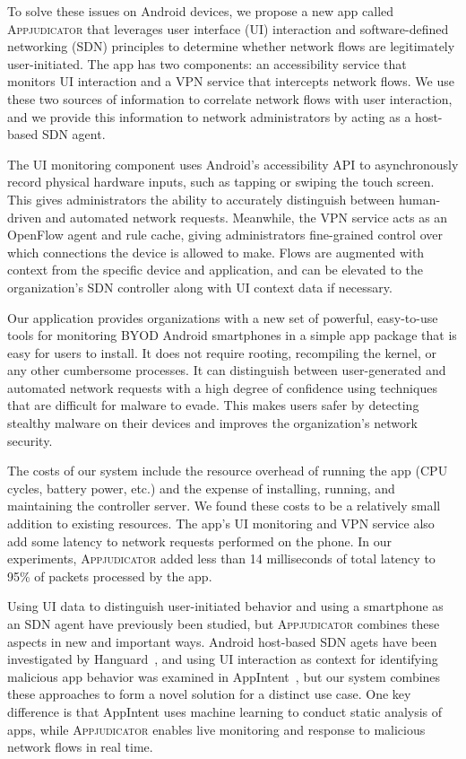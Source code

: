 
To solve these issues on Android devices, we propose a new app called
\textsc{Appjudicator} that leverages user interface (UI) interaction and
software-defined networking (SDN) principles to determine whether network flows
are legitimately user-initiated. The app has two components: an accessibility
service that monitors UI interaction and a VPN service that intercepts network
flows. We use these two sources of information to correlate network flows with
user interaction, and we provide this information to network administrators by
acting as a host-based SDN agent.

The UI monitoring component uses Android's accessibility API to asynchronously
record physical hardware inputs, such as tapping or swiping the touch screen.
This gives administrators the ability to accurately distinguish between
human-driven and automated network requests. Meanwhile, the VPN service acts as
an OpenFlow agent and rule cache, giving administrators fine-grained control
over which connections the device is allowed to make. Flows are augmented with
context from the specific device and application, and can be elevated to the
organization's SDN controller along with UI context data if necessary.


Our application provides organizations with a new set of powerful, easy-to-use
tools for monitoring BYOD Android smartphones in a simple app package that is
easy for users to install. It does not require rooting, recompiling the kernel,
or any other cumbersome processes. It can distinguish between user-generated and
automated network requests with a high degree of confidence using techniques
that are difficult for malware to evade. This makes users safer by detecting
stealthy malware on their devices and improves the organization's network
security.

The costs of our system include the resource overhead of running the app (CPU
cycles, battery power, etc.) and the expense of installing, running, and
maintaining the controller server. We found these costs to be a relatively
small addition to existing resources. The app's UI monitoring and VPN service
also add some latency to network requests performed on the phone. In our
experiments, \textsc{Appjudicator} added less than 14 milliseconds of total
latency to 95\% of packets processed by the app.


Using UI data to distinguish user-initiated behavior and using a smartphone as
an SDN agent have previously been studied, but \textsc{Appjudicator} combines
these aspects in new and important ways. Android host-based SDN agets have been
investigated by Hanguard~\cite{demetriou2017}, and using UI interaction as
context for identifying malicious app behavior was examined in
AppIntent~\cite{yang2013}, but our system combines these approaches to form a
novel solution for a distinct use case. One key difference is that AppIntent
uses machine learning to conduct static analysis of apps, while
\textsc{Appjudicator} enables live monitoring and response to malicious network
flows in real time.

